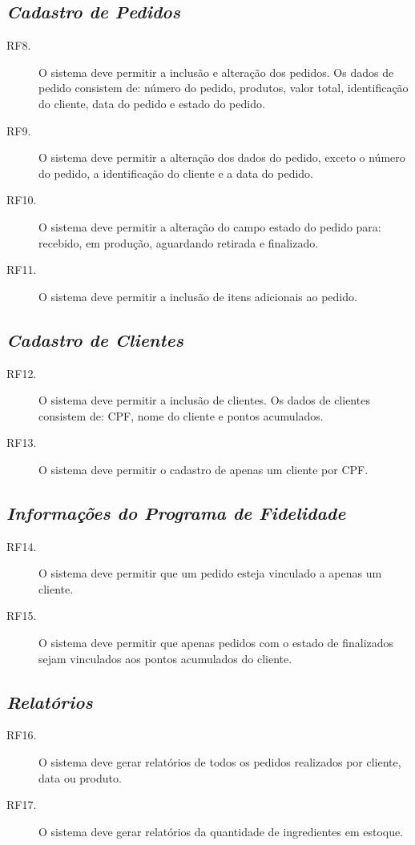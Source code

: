 \documentclass[article, 12pt, oneside, a4paper, brazil]{abntex2}
\begin{document}
 \subsection*{\emph{Cadastro de Pedidos}}
 \begin{description}
  \item [RF8.] O sistema deve permitir a inclusão e alteração dos pedidos. Os dados de pedido consistem de: número do pedido, produtos, valor total, identificação do cliente, data do pedido e estado do pedido.
  \item [RF9.] O sistema deve permitir a alteração dos dados do pedido, exceto o número do pedido, a identificação do cliente e a data do pedido.
  \item [RF10.] O sistema deve permitir a alteração do campo estado do pedido para: recebido, em produção, aguardando retirada e finalizado.
  \item [RF11.] O sistema deve permitir a inclusão de itens adicionais ao pedido.
 \end{description}
 
 \subsection*{\emph{Cadastro de Clientes}}
 \begin{description}
  \item [RF12.] O sistema deve permitir a inclusão de clientes. Os dados de clientes consistem de: CPF, nome do cliente e pontos acumulados.
  \item [RF13.] O sistema deve permitir o cadastro de apenas um cliente por CPF.
 \end{description}
 
 \subsection*{\emph{Informações do Programa de Fidelidade}}
 \begin{description}
  \item [RF14.] O sistema deve permitir que um pedido esteja vinculado a apenas um cliente.
  \item [RF15.] O sistema deve permitir que apenas pedidos com o estado de finalizados sejam vinculados aos pontos acumulados do cliente.
 \end{description}
 
 \subsection*{\emph{Relatórios}}
 \begin{description}
  \item [RF16.] O sistema deve gerar relatórios de todos os pedidos realizados por cliente, data ou produto.
  \item [RF17.] O sistema deve gerar relatórios da quantidade de ingredientes em estoque.
 \end{description}
 
\end{document}

